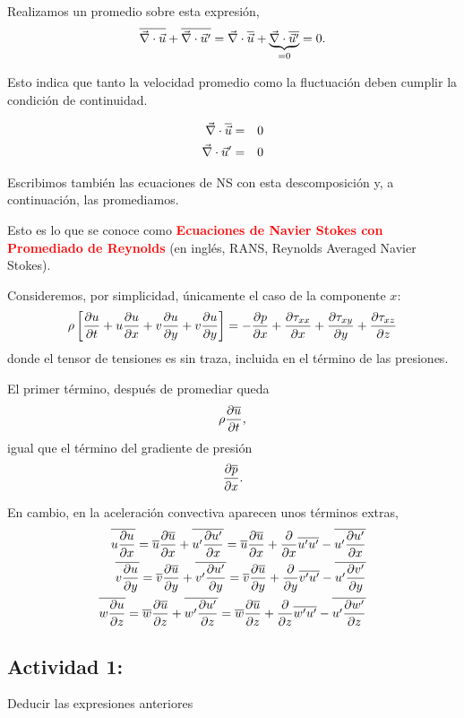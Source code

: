 	
	Realizamos un promedio sobre esta expresión, 
	\[
	\overline{\vec{\nabla}\cdot\vec{u}}+\overline{\vec{\nabla}\cdot\vec{u}'}=\vec{\nabla}\cdot\overline{\vec{u}}+\underbrace{\vec{\nabla}\cdot\overline{\vec{u}'}}_{=0}=0.
	\]
	
	Esto indica que tanto la velocidad promedio como la fluctuación deben
	cumplir la condición de continuidad.
	
	\begin{eqnarray*}
		\vec{\nabla}\cdot\overline{\vec{u}} & = & 0\\
		\vec{\nabla}\cdot\vec{u}' & = & 0
	\end{eqnarray*}
	
	Escribimos también las ecuaciones de NS con esta descomposición y,
	a continuación, las promediamos. 
	
	Esto es lo que se conoce como \textbf{\textcolor{red}{Ecuaciones de
			Navier Stokes con Promediado de Reynolds}} (en inglés, RANS, Reynolds
	Averaged Navier Stokes). 

	
	Consideremos, por simplicidad, únicamente el caso de la componente
	$x$: 
	\[
	\rho\left[\frac{\partial u}{\partial t}+u\frac{\partial u}{\partial x}+v\frac{\partial u}{\partial y}+v\frac{\partial u}{\partial y}\right]=-\frac{\partial p}{\partial x}+\frac{\partial \tau_{xx}}{\partial x}+\frac{\partial \tau_{xy}}{\partial y}+\frac{\partial \tau_{xz}}{\partial z}
	\]
	donde el tensor de tensiones es sin traza, incluida en el término
	de las presiones.
	
	El primer término, después de promediar queda 
	\[
	\rho\frac{\partial \overline{u}}{\partial t},
	\]
	igual que el término del gradiente de presión 
	\[
	\frac{\partial \overline{p}}{\partial x}.
	\]
	
	
	En cambio, en la aceleración convectiva aparecen unos términos extras,
	\begin{eqnarray*}
		\overline{u\frac{\partial u}{\partial x}}=\overline{u}\frac{\partial \overline{u}}{\partial x}+\overline{u'\frac{\partial u'}{\partial x}}=\overline{u}\frac{\partial \overline{u}}{\partial x}+\frac{\partial }{\partial x}{\overline{u'u'}}-\overline{u'\frac{\partial u'}{\partial x}}\\
		\overline{v\frac{\partial u}{\partial y}}=\overline{v}\frac{\partial \overline{u}}{\partial y}+\overline{v'\frac{\partial u'}{\partial y}}=\overline{v}\frac{\partial \overline{u}}{\partial y}+\frac{\partial }{\partial y}{\overline{v'u'}}-\overline{u'\frac{\partial v'}{\partial y}}\\
		\overline{w\frac{\partial u}{\partial z}}=\overline{w}\frac{\partial \overline{u}}{\partial z}+\overline{w'\frac{\partial u'}{\partial z}}=\overline{w}\frac{\partial \overline{u}}{\partial z}+\frac{\partial }{\partial z}{\overline{w'u'}}-\overline{u'\frac{\partial w'}{\partial z}}
	\end{eqnarray*}
	
	\subsection*{Actividad 1:}
		Deducir las expresiones anteriores

